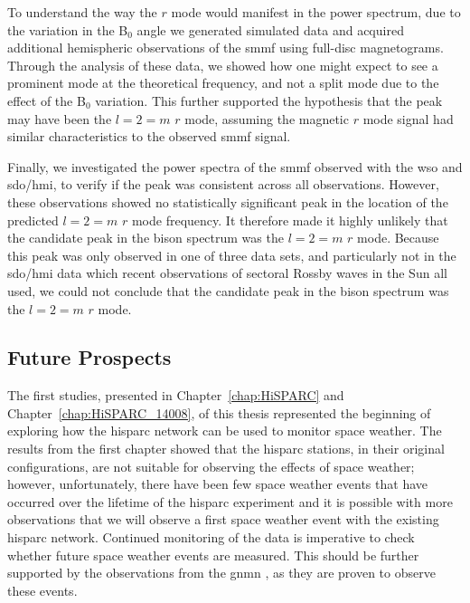 To understand the way the $r$ mode would manifest in the power spectrum, due to the variation in the B$_0$ angle we generated simulated data and acquired additional  hemispheric observations of the \gls{smmf} using full-disc magnetograms. Through the analysis of these data, we showed how one might expect to see a prominent mode at the theoretical frequency, and not a split mode due to the effect of the B$_0$ variation. This further supported the hypothesis that the peak may have been the $l=2=m$ $r$ mode, assuming the magnetic $r$ mode signal had similar characteristics to the observed \gls{smmf} signal.

Finally, we investigated the power spectra of the \gls{smmf} observed with the \gls{wso} and \gls{sdo/hmi}, to verify if the peak was consistent across all observations. However, these observations showed no statistically significant peak in the location of the predicted $l=2=m$ $r$ mode frequency. It therefore made it highly unlikely that the candidate peak in the \gls{bison} spectrum was the $l=2=m$ $r$ mode. Because this peak was only observed in one of three data sets, and particularly not in the \gls{sdo/hmi} data which recent observations of sectoral Rossby waves in the Sun all used, we could not conclude that the candidate peak in the \gls{bison} spectrum was the $l=2=m$ $r$ mode. 


\subsection*{Future Prospects}

The first studies, presented in Chapter~\ref{chap:HiSPARC} and Chapter~\ref{chap:HiSPARC_14008}, of this thesis represented the beginning of exploring how the \gls{hisparc} network can be used to monitor space weather. The results from the first chapter showed that the \gls{hisparc} stations, in their original configurations, are not suitable for observing the effects of space weather; however, unfortunately, there have been few space weather events that have occurred over the lifetime of the \gls{hisparc} experiment and it is possible with more observations that we will observe a first space weather event with the existing \gls{hisparc} network. Continued monitoring of the data is imperative to check whether future space weather events are measured. This should be further supported by the observations from the \gls{gnmn} \citep{mishev_current_2020}, as they are proven to observe these events.


